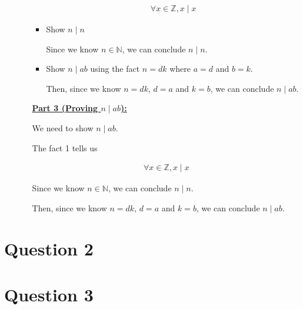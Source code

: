 \documentclass[12pt]{article}
\begin{document}
\begin{enumerate}[a.]
\begin{mdframed}
\begin{enumerate}[1.]
\begin{itemize}
\begin{mdframed}
            \begin{align}
                \forall x \in \mathbb{Z}, x \mid x
            \end{align}
            \end{mdframed}

            \item Show $n \mid n$

            \begin{mdframed}
            Since we know $n \in \mathbb{N}$, we can conclude $n \mid n$.
            \end{mdframed}

            \item Show $n \mid ab$ using the fact $n = dk$ where $a = d$ and $b = k$.

            \begin{mdframed}
            Then, since we know $n = dk$, $d = a$ and $k = b$, we can conclude
            $n \mid ab$.
            \end{mdframed}
        \end{itemize}

        \begin{mdframed}

        \underline{\textbf{Part 3 (Proving $n \mid ab$):}}

        \bigskip

        We need to show $n \mid ab$.

        \bigskip

        The fact 1 tells us

        \begin{align}
            \forall x \in \mathbb{Z}, x \mid x
        \end{align}

        \bigskip

        Since we know $n \in \mathbb{N}$, we can conclude $n \mid n$.

        \bigskip

        Then, since we know $n = dk$, $d = a$ and $k = b$, we can conclude
        $n \mid ab$.
        \end{mdframed}

    \end{enumerate}

    \end{mdframed}

\end{enumerate}

\section*{Question 2}

\section*{Question 3}
\end{document}
